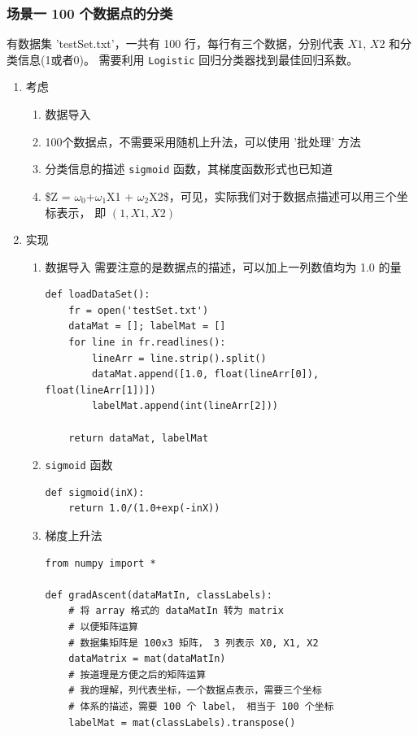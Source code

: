 \documentclass[11pt]{ctexart}
\begin{document}
\subsubsection{场景一 100 个数据点的分类}
\label{sec:orgheadline59}
有数据集 'testSet.txt'，一共有 100 行，每行有三个数据，分别代表 \(X1\), \(X2\) 和分类信息(1或者0)。
需要利用 \texttt{Logistic} 回归分类器找到最佳回归系数。
\begin{enumerate}
\item 考虑
\label{sec:orgheadline57}
\begin{enumerate}
\item 数据导入
\item 100个数据点，不需要采用随机上升法，可以使用 '批处理' 方法
\item 分类信息的描述 \texttt{sigmoid} 函数，其梯度函数形式也已知道
\item \$Z = \(\omega_{\text{0}}\)+\(\omega_{\text{1}}\)X1 + \(\omega_{\text{2}}\)X2\$，可见，实际我们对于数据点描述可以用三个坐标表示，
即 \((1, X1, X2)\)
\end{enumerate}
\item 实现
\label{sec:orgheadline58}
\begin{enumerate}
\item 数据导入
需要注意的是数据点的描述，可以加上一列数值均为 1.0 的量
\lstset{language=Python,label= ,caption= ,captionpos=b,numbers=none}
\begin{lstlisting}
def loadDataSet():
    fr = open('testSet.txt')
    dataMat = []; labelMat = []
    for line in fr.readlines():
        lineArr = line.strip().split()
        dataMat.append([1.0, float(lineArr[0]), float(lineArr[1])])
        labelMat.append(int(lineArr[2]))

    return dataMat, labelMat
\end{lstlisting}

\item \texttt{sigmoid} 函数
\lstset{language=Python,label= ,caption= ,captionpos=b,numbers=none}
\begin{lstlisting}
def sigmoid(inX):
    return 1.0/(1.0+exp(-inX))
\end{lstlisting}

\item 梯度上升法
\lstset{language=Python,label= ,caption= ,captionpos=b,numbers=none}
\begin{lstlisting}
from numpy import *

def gradAscent(dataMatIn, classLabels):
    # 将 array 格式的 dataMatIn 转为 matrix
    # 以便矩阵运算
    # 数据集矩阵是 100x3 矩阵， 3 列表示 X0, X1, X2
    dataMatrix = mat(dataMatIn)
    # 按道理是方便之后的矩阵运算
    # 我的理解，列代表坐标，一个数据点表示，需要三个坐标
    # 体系的描述，需要 100 个 label， 相当于 100 个坐标
    labelMat = mat(classLabels).transpose()


\end{lstlisting}
\end{enumerate}
\end{enumerate}
\end{document}
